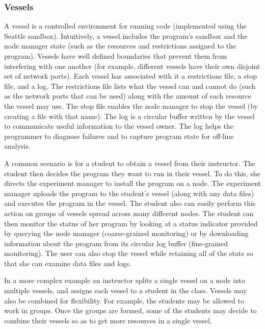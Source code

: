 \subsubsection{Vessels}

A vessel is a controlled environment for running code (implemented
using the Seattle sandbox).  Intuitively, a vessel includes the
program's sandbox and the node manager state (such as the resources
and restrictions assigned to the program).  Vessels have well defined
boundaries that prevent them from interfering with one another (for
example, different vessels have their own disjoint set of network
ports).  Each vessel has associated with it a restrictions file, a
stop file, and a log.  The restrictions file lists what the vessel can
and cannot do (such as the network ports that can be used) along with
the amount of each resource the vessel may use.  The stop file enables
the node manager to stop the vessel (by creating a file with that
name). The log is a circular buffer written by the vessel to
communicate useful information to the vessel owner. The log helps the
programmer to diagnose failures and to capture program state for
off-line analysis.

A common scenario is for a student to obtain a vessel from their
instructor. The student then decides the program they want to run in
their vessel. To do this, she directs the experiment manager to
install the program on a node. The experiment manager uploads the
program to the student's vessel (along with any data files) and
executes the program in the vessel. The student also can easily perform
this action on groups of vessels spread across many different nodes.
The student can then monitor the status of her program by looking at a 
status indicator provided by querying the node manager (coarse-grained 
monitoring) or by downloading information 
about the program from its circular log buffer (fine-grained monitoring).  
The user can also stop the vessel while retaining all of the state so that 
she can examine data files and logs.   

In a more complex example an instructor splits a single vessel on a
node into multiple vessels, and
assigns each vessel to a student
in the class. Vessels may also be combined for flexibility. For example,
the students may be allowed to work in groups. Once the groups are
formed, some of the students may decide to combine their vessels so as
to get more resources in a single vessel.

